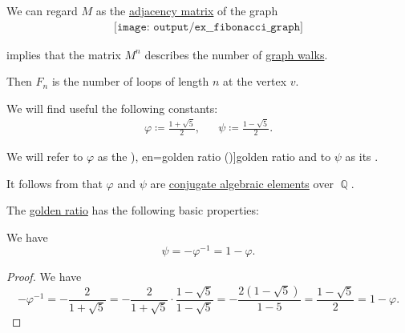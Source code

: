 \begin{example}
\begin{thmenum}
     We can regard \( M \) as the \hyperref[def:graph_adjacency_matrix]{adjacency matrix} of the graph
    \begin{equation}\label{eq:ex:fibonacci_matrix/graph}
      \begin{aligned}
        \texttt{[image: output/ex\_\_fibonacci\_graph]}
      \end{aligned}
    \end{equation}

     implies that the matrix \( M^n \) describes the number of \hyperref[def:graph_walk]{graph walks}.

    Then \( F_n \) is the number of loops of length \( n \) at the vertex \( v \).
  \end{thmenum}
\end{example}

\begin{definition}\label{def:golden_ratio}\mimprovised
  We will find useful the following constants:
  \begin{align*}
    \varphi \coloneqq \frac {1 + \sqrt 5} 2,
    &&
    \psi \coloneqq \frac {1 - \sqrt 5} 2.
  \end{align*}

  We will refer to \( \varphi \) as the \term[ru=золотое сечение (\cite[exerc. 7.18]{ГашковЧубариков2005СложностьВычисления}), en=golden ratio (\cite[35]{Knuth1997ArtVol1})]{golden ratio} and to \( \psi \) as its .
\end{definition}
\begin{comments}
  \item It follows from  that \( \varphi \) and \( \psi \) are \hyperref[def:conjugate_algebraic_element]{conjugate algebraic elements} over \( \BbbQ \).
\end{comments}

\begin{proposition}\label{thm:def:golden_ratio}
  The \hyperref[def:golden_ratio]{golden ratio} has the following basic properties:
  \begin{thmenum}
     We have
    \begin{equation}\label{eq:thm:def:golden_ratio/conjugate}
      \psi = -\varphi^{-1} = 1 - \varphi.
    \end{equation}
  \end{thmenum}
\end{proposition}
\begin{proof}
   We have
  \begin{equation*}
    -\varphi^{-1}
    =
    -\frac 2 {1 + \sqrt 5}
    =
    -\frac 2 {1 + \sqrt 5} \cdot \frac {1 - \sqrt 5} {1 - \sqrt 5}
    =
    -\frac {2(1 - \sqrt 5)} {1 - 5}
    =
    \frac {1 - \sqrt 5} 2
    =
    1 - \varphi.
  \end{equation*}
\end{proof}

